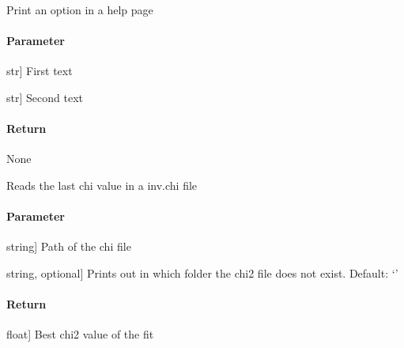 \documentclass[letterpaper,10pt,english]{sphinxmanual}
\begin{document}
\begin{fulllineitems}
\label{\detokenize{functions:sir.option}}
\pysigstartsignatures
{}
\pysigstopsignatures
\sphinxAtStartPar
Print an option in a help page


\paragraph{Parameter}
\label{\detokenize{functions:id1}}\begin{description}
\sphinxlineitem{text1}{[}str{]}
\sphinxAtStartPar
First text

\sphinxlineitem{text2}{[}str{]}
\sphinxAtStartPar
Second text

\end{description}


\paragraph{Return}
\label{\detokenize{functions:id2}}
\sphinxAtStartPar
None

\end{fulllineitems}


\begin{fulllineitems}
\label{\detokenize{functions:sir.read_chi2}}
\pysigstartsignatures
{}
\pysigstopsignatures
\sphinxAtStartPar
Reads the last chi value in a inv.chi file


\paragraph{Parameter}
\label{\detokenize{functions:id3}}\begin{description}
\sphinxlineitem{filename}{[}string{]}
\sphinxAtStartPar
Path of the chi file

\sphinxlineitem{task}{[}string, optional{]}
\sphinxAtStartPar
Prints out in which folder the chi2 file does not exist. Default: ‘’

\end{description}


\paragraph{Return}
\label{\detokenize{functions:id4}}\begin{description}
\sphinxlineitem{chi2}{[}float{]}
\sphinxAtStartPar
Best chi2 value of the fit

\end{description}

\end{fulllineitems}
\end{document}
